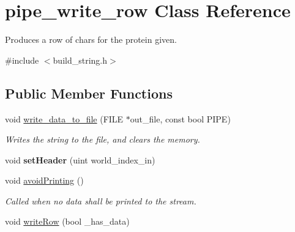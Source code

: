 \hypertarget{classpipe__write__row}{
\section{pipe\_\-write\_\-row Class Reference}
\label{classpipe__write__row}
}


Produces a row of chars for the protein given.  




{\ttfamily \#include $<$build\_\-string.h$>$}

\subsection*{Public Member Functions}
\begin{DoxyCompactItemize}
\item 
\hypertarget{classpipe__write__row_a5fee0bd54cbb30300a4756907c04e4f1}{
void \hyperlink{classpipe__write__row_a5fee0bd54cbb30300a4756907c04e4f1}{write\_\-data\_\-to\_\-file} (FILE $\ast$out\_\-file, const bool PIPE)}
\label{classpipe__write__row_a5fee0bd54cbb30300a4756907c04e4f1}

\begin{DoxyCompactList}\small\item\em Writes the string to the file, and clears the memory. \end{DoxyCompactList}\item 
\hypertarget{classpipe__write__row_afb2d2a9f84969825815856aa802e1289}{
void {\bfseries setHeader} (uint world\_\-index\_\-in)}
\label{classpipe__write__row_afb2d2a9f84969825815856aa802e1289}

\item 
\hypertarget{classpipe__write__row_ad6f99e8e25d7e1b233990842c137521c}{
void \hyperlink{classpipe__write__row_ad6f99e8e25d7e1b233990842c137521c}{avoidPrinting} ()}
\label{classpipe__write__row_ad6f99e8e25d7e1b233990842c137521c}

\begin{DoxyCompactList}\small\item\em Called when no data shall be printed to the stream. \end{DoxyCompactList}\item 
\hypertarget{classpipe__write__row_abe1880c2d49175ad46e61d5433628cc4}{
void \hyperlink{classpipe__write__row_abe1880c2d49175ad46e61d5433628cc4}{writeRow} (bool \_\-has\_\-data)}
\label{classpipe__write__row_abe1880c2d49175ad46e61d5433628cc4}


\end{DoxyCompactItemize}
